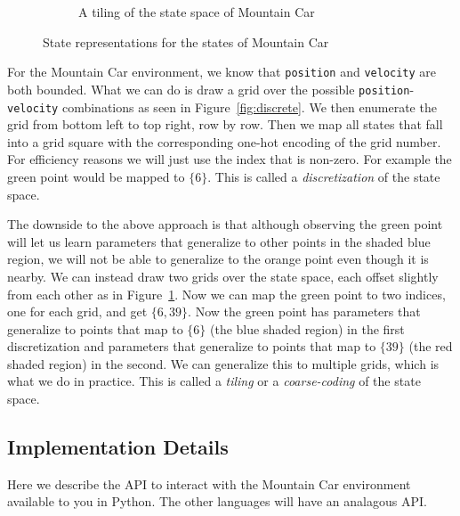 \documentclass[11pt,addpoints,answers]{exam}
\begin{document}
\begin{figure}[H]
\begin{subfigure}{0.5\textwidth}
\caption{A tiling of the state space of Mountain Car}
\label{fig:tiling}
\end{subfigure}

\caption{State representations for the states of Mountain Car}
\label{fig:states}
\end{figure}

For the Mountain Car environment, we know that \texttt{position} and \texttt{velocity} are both bounded. What we can do is draw a grid over the possible \texttt{position}-\texttt{velocity} combinations as seen in Figure~\ref{fig:discrete}. We then enumerate the grid from bottom left to top right, row by row. Then we map all states that fall into a grid square with the corresponding one-hot encoding of the grid number. For efficiency reasons we will just use the index that is non-zero. For example the green point would be mapped to $\{6\}$. This is called a \emph{discretization} of the state space.

The downside to the above approach is that although observing the green point will let us learn parameters that generalize to other points in the shaded blue region, we will not be able to generalize to the orange point even though it is nearby. We can instead draw two grids over the state space, each offset slightly from each other as in Figure~\ref{fig:tiling}. Now we can map the green point to two indices, one for each grid, and get $\{6, 39\}$. Now the green point has parameters that generalize to points that map to $\{6\}$ (the blue shaded region) in the first discretization and parameters that generalize to points that map to $\{39\}$ (the red shaded region) in the second. We can generalize this to multiple grids, which is what we do in practice. This is called a \emph{tiling} or a \emph{coarse-coding} of the state space. 


\subsection{Implementation Details}
Here we describe the API to interact with the Mountain Car environment available to you in Python. The other languages will have an analagous API.
\end{document}
